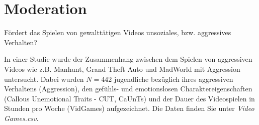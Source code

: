 \documentclass[]{article}
\begin{document}
\hypertarget{moderation}{%
\section*{Moderation}\label{moderation}}

Fördert das Spielen von gewalttätigen Videos unsoziales, bzw. aggressives Verhalten?

In einer Studie wurde der Zusammenhang zwischen dem Spielen von aggressiven Videos wie z.B. Manhunt, Grand Theft Auto und MadWorld mit Aggression untersucht. Dabei wurden \(N = 442\) jugendliche bezüglich ihres aggressiven Verhaltens (Aggression), den gefühls- und emotionslosen Charaktereigenschaften (Callous Unemotional Traits - CUT, CaUnTs) und der Dauer des Videospielen in Stunden pro Woche (VidGames) aufgezeichnet. Die Daten finden Sie unter \emph{Video Games.csv}.
\end{document}
